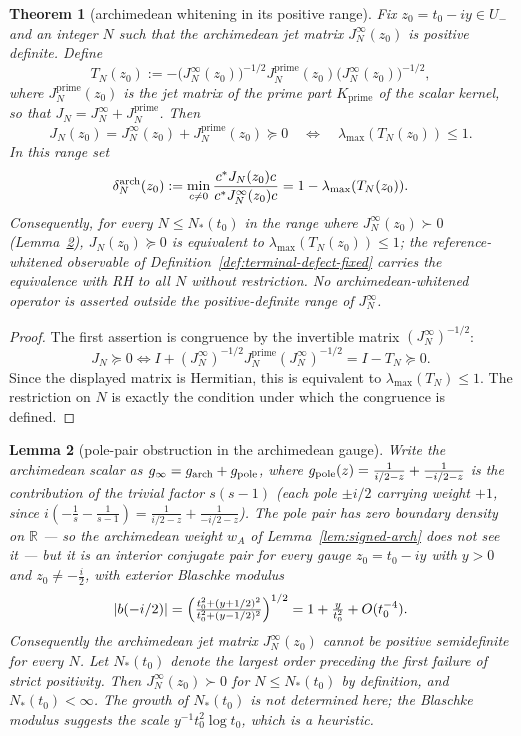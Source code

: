 \documentclass[11pt]{amsart}
\newtheorem{theorem}{Theorem}[section]
\newtheorem{lemma}[theorem]{Lemma}
\theoremstyle{definition}
\theoremstyle{remark}
\theoremstyle{definition}
\newcommand{\R}{\mathbb{R}}
\begin{document}
\begin{theorem}[archimedean whitening in its positive range]\label{thm:whitened-terminal}
Fix $z_0=t_0-iy\in U_-$ and an integer $N$ such that the archimedean jet matrix
$J_N^\infty(z_0)$ is positive definite.  Define
\[
   T_N(z_0):=-
   \bigl(J_N^\infty(z_0)\bigr)^{-1/2}
   J_N^{\mathrm{prime}}(z_0)
   \bigl(J_N^\infty(z_0)\bigr)^{-1/2},
\]
where $J_N^{\mathrm{prime}}(z_0)$ is the jet matrix of the prime part $K_{\mathrm{prime}}$ of the scalar
kernel, so that $J_N=J_N^\infty+J_N^{\mathrm{prime}}$.  Then
\[
   J_N(z_0)=J_N^\infty(z_0)+J_N^{\mathrm{prime}}(z_0)\succeq0
   \quad\Longleftrightarrow\quad
   \lambda_{\max}(T_N(z_0))\le1 .
\]
In this range set
\[
   \delta_N^{\rm arch}(z_0)
   :=\min_{c\ne0}\frac{c^*J_N(z_0)c}{c^*J_N^\infty(z_0)c}
   =1-\lambda_{\max}(T_N(z_0)).
\]
Consequently, for every $N\le N_*(t_0)$ in the range where $J_N^\infty(z_0)\succ0$
(Lemma~\ref{lem:pole-pair}), $J_N(z_0)\succeq0$ is equivalent to $\lambda_{\max}(T_N(z_0))\le1$; the
reference-whitened observable of Definition~\ref{def:terminal-defect-fixed} carries the equivalence with
RH to \emph{all} $N$ without restriction.  No archimedean-whitened operator is asserted outside the
positive-definite range of $J_N^\infty$.
\end{theorem}

\begin{proof}
The first assertion is congruence by the invertible matrix
$(J_N^\infty)^{-1/2}$:
\[
   J_N\succeq0
   \Longleftrightarrow
   I+(J_N^\infty)^{-1/2}J_N^{\mathrm{prime}}(J_N^\infty)^{-1/2}=I-T_N\succeq0.
\]
Since the displayed matrix is Hermitian, this is equivalent to
$\lambda_{\max}(T_N)\le1$.  The restriction on $N$ is exactly the condition under which the congruence
is defined.
\end{proof}

\begin{lemma}[pole-pair obstruction in the archimedean gauge]\label{lem:pole-pair}
Write the archimedean scalar as $g_\infty=g_{\rm arch}+g_{\rm pole}$, where
$g_{\rm pole}(z)=\frac1{i/2-z}+\frac1{-i/2-z}$ is the contribution of the trivial factor $s(s-1)$ (each
pole $\pm i/2$ carrying weight $+1$, since $i(-\tfrac1s-\tfrac1{s-1})=\tfrac1{i/2-z}+\tfrac1{-i/2-z}$).
The pole pair has zero boundary density on $\R$ --- so the archimedean weight $w_A$ of
Lemma~\ref{lem:signed-arch} does not see it --- but it is an interior conjugate pair for every gauge
$z_0=t_0-iy$ with $y>0$ and $z_0\ne-\tfrac i2$, with exterior Blaschke modulus
\[
   |b(-i/2)|=\Bigl(\tfrac{t_0^2+(y+1/2)^2}{t_0^2+(y-1/2)^2}\Bigr)^{1/2}
   =1+\tfrac{y}{t_0^2}+O(t_0^{-4}).
\]
Consequently the archimedean jet matrix $J_N^\infty(z_0)$ cannot be positive semidefinite for every
$N$.  Let $N_*(t_0)$ denote the largest order preceding the first failure of
strict positivity.  Then $J_N^\infty(z_0)\succ0$ for $N\le N_*(t_0)$ by definition, and
$N_*(t_0)<\infty$.  The growth of $N_*(t_0)$ is not determined here; the Blaschke modulus suggests the
scale $y^{-1}t_0^2\log t_0$, which is a heuristic.
\end{lemma}
\end{document}
